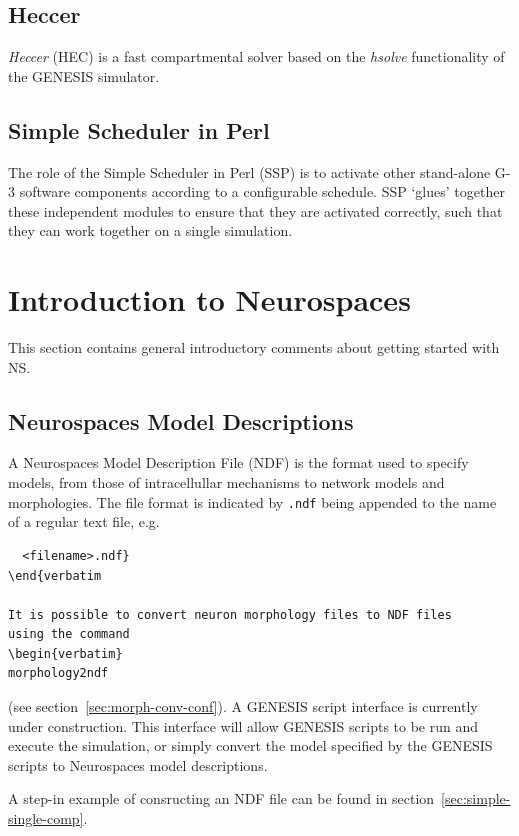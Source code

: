 \documentclass[12pt]{article}
\begin{document}
\subsection{Heccer}

{\it Heccer} (HEC) is a fast compartmental solver based on the {\it
  hsolve} functionality of the GENESIS simulator.

\subsection{Simple Scheduler in Perl}

The role of the Simple Scheduler in Perl (SSP) is to activate other
stand-alone G-3 software components according to a configurable
schedule. SSP `glues' together these independent modules to ensure
that they are activated correctly, such that they can work together on
a single simulation.
 
\section{Introduction to Neurospaces}

This section contains general introductory comments about getting
started with NS.

\subsection{Neurospaces Model Descriptions}

A Neurospaces Model Description File (NDF) is the format used to
specify models, from those of intracellullar mechanisms to network
models and morphologies.  The file format is indicated by {\tt .ndf}
being appended to the name of a regular text file, e.g.
\begin{verbatim}
  <filename>.ndf}
\end{verbatim

It is possible to convert neuron morphology files to NDF files
using the command
\begin{verbatim}
morphology2ndf
\end{verbatim}
(see section~\ref{sec:morph-conv-conf}).  A GENESIS script interface is
currently under construction.  This interface will allow 
GENESIS scripts to be run and execute the simulation, or simply convert the
model specified by the GENESIS scripts to Neurospaces model
descriptions.

A step-in example of consructing an NDF file can
be found in section~\ref{sec:simple-single-comp}.
\end{document}
